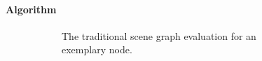\paragraph{Algorithm} \label{contributions:astro:dsg:algorithm}
\begin{figure}
\centering
\begin{subfigure}[b]{0.4\textwidth}
    \caption{The traditional scene graph evaluation for an exemplary node.}
    \label{contributions:astro:dsg:sceengraph:traditional}
\end{subfigure}
\hspace*{1cm}
\begin{subfigure}[b]{0.4\textwidth}

\end{subfigure}
\end{figure}
